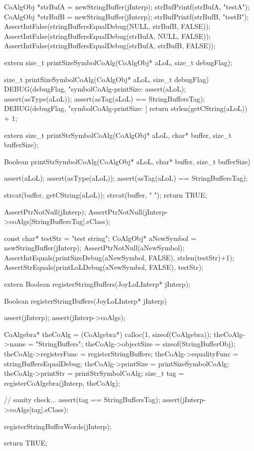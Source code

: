 \startCTest
  CoAlgObj *strBufA = newStringBuffer(jInterp);
  strBufPrintf(strBufA, "testA");
  CoAlgObj *strBufB = newStringBuffer(jInterp);
  strBufPrintf(strBufB, "testB");
  AssertIntFalse(stringBuffersEqualDebug(NULL, strBufB, FALSE));
  AssertIntFalse(stringBuffersEqualDebug(strBufA, NULL, FALSE));
  AssertIntFalse(stringBuffersEqualDebug(strBufA, strBufB, FALSE));
\stopCTest
\stopTestCase
\stopTestSuite


\startCHeader
extern size_t printSizeSymbolCoAlg(CoAlgObj* aLoL, size_t debugFlag);
\stopCHeader

\startCCode
size_t printSizeSymbolCoAlg(CoAlgObj* aLoL, size_t debugFlag) {
  DEBUG(debugFlag, "symbolCoAlg-printSize: %
  assert(aLoL);
  assert(asType(aLoL));
  assert(asTag(aLoL) == StringBuffersTag);
  DEBUG(debugFlag, "symbolCoAlg-printSize: [%
  return strlen(getCString(aLoL)) + 1;
}
\stopCCode

\startCHeader
extern size_t printStrSymbolCoAlg(CoAlgObj* aLoL,
                                  char* buffer, size_t bufferSize);
\stopCHeader

\startCCode
Boolean printStrSymbolCoAlg(CoAlgObj* aLoL,
                           char* buffer, size_t bufferSize) {
  assert(aLoL);
  assert(asType(aLoL));
  assert(asTag(aLoL) == StringBuffersTag);

  strcat(buffer, getCString(aLoL));
  strcat(buffer, " ");
  return TRUE;
}
\stopCCode


\startCTest
  AssertPtrNotNull(jInterp);
  AssertPtrNotNull(jInterp->coAlgs[StringBuffersTag].sClass);

  const char* testStr = "test string";
  CoAlgObj* aNewSymbol = newStringBuffer(jInterp);
  AssertPtrNotNull(aNewSymbol);
  AssertIntEquals(printSizeDebug(aNewSymbol, FALSE), strlen(testStr)+1);
  AssertStrEquals(printLoLDebug(aNewSymbol, FALSE), testStr);
\stopCTest
\skipTestCase
\stopTestSuite

\startTestSuite[registerStringBuffers]

\startCHeader
extern Boolean registerStringBuffers(JoyLoLInterp* jInterp);
\stopCHeader
{}

\startCCode
Boolean registerStringBuffers(JoyLoLInterp* jInterp) {
  assert(jInterp);
  assert(jInterp->coAlgs);
  
  CoAlgebra* theCoAlg    = (CoAlgebra*) calloc(1, sizeof(CoAlgebra));
  theCoAlg->name         = "StringBuffers";
  theCoAlg->objectSize   = sizeof(StringBufferObj);
  theCoAlg->registerFunc = registerStringBuffers;
  theCoAlg->equalityFunc = stringBuffersEqualDebug;
  theCoAlg->printSize    = printSizeSymbolCoAlg;
  theCoAlg->printStr     = printStrSymbolCoAlg;
  size_t tag = registerCoAlgebra(jInterp, theCoAlg);
  
  // sanity check...
  assert(tag == StringBuffersTag);
  assert(jInterp->coAlgs[tag].sClass);

  registerStringBufferWords(jInterp);

  return TRUE;
}
\stopCCode

